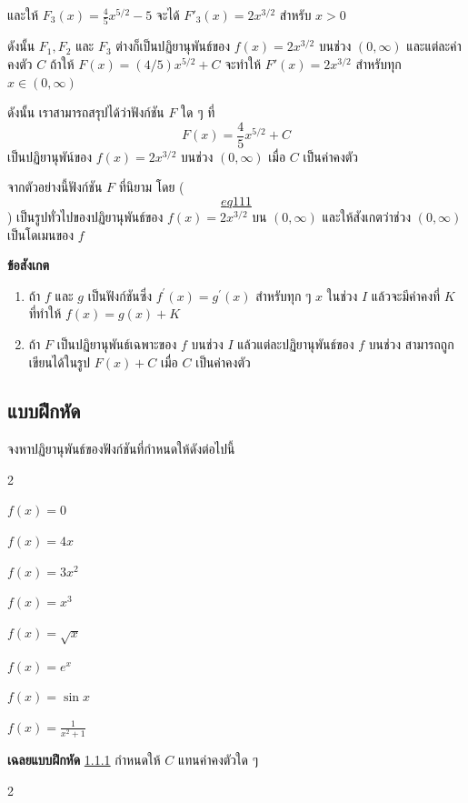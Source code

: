 \documentclass[
]{book}
\theoremstyle{definition}
\theoremstyle{definition}
\theoremstyle{definition}
\theoremstyle{definition}
\theoremstyle{remark}
\begin{document}
และให้ \(\displaystyle F_{3}(x) = \frac{4}{5} x^{5/2} - 5\) จะได้
\(F'_3(x) = 2x^{3/2}\) สำหรับ \(x > 0\)

ดังนั้น \(F_1,F_2\) และ \(F_3\) ต่างก็เป็นปฏิยานุพันธ์ของ \(f(x) = 2x^{3/2}\) บนช่วง
\(\left( {0 ,\infty } \right)\) และแต่ละค่าคงตัว \(C\) ถ้าให้
\(F(x) =(4/5)x^{5/2} + C\) จะทำให้ \(F'(x) = 2x^{3/2}\) สำหรับทุก
\(x \in \left( 0 ,\infty  \right)\)

ดังนั้น เราสามารถสรุปได้ว่าฟังก์ชัน \(F\) ใด ๆ ที่ \[\label{eq111} 
    F(x) = \frac{4}{5} x^{5/2} + C\] เป็นปฏิยานุพัน์ของ \(f(x) = 2x^{3/2}\)
บนช่วง \(\left( 0 ,\infty  \right)\) เมื่อ \(C\) เป็นค่าคงตัว

จากตัวอย่างนี้ฟังก์ชัน \(F\) ที่นิยาม โดย (\hyperref[eq111]{\[eq111\]}) เป็นรูปทั่วไปของปฏิยานุพันธ์ของ \(f(x) = 2x^{3/2}\) บน
\(\left( 0 ,\infty  \right)\) และให้สังเกตว่าช่วง \(\left( 0
,\infty  \right)\) เป็นโดเมนของ \(f\)

\textbf{ข้อสังเกต}

\begin{enumerate}
\def\labelenumi{\arabic{enumi}.}
\item
  ถ้า \(f\) และ \(g\) เป็นฟังก์ชันซึ่ง \(f^{'}(x) = g^{'}(x)\) สำหรับทุก ๆ \(x\) ในช่วง
  \(I\) แล้วจะมีค่าคงที่ \(K\) ที่ทำให้ \(f(x) = g(x) + K\)
\item
  ถ้า \(F\) เป็นปฏิยานุพันธ์เฉพาะของ \(f\) บนช่วง \(I\) แล้วแต่ละปฏิยานุพันธ์ของ \(f\)
  บนช่วง สามารถถูกเขียนได้ในรูป \(F(x) + C\) เมื่อ \(C\) เป็นค่าคงตัว
\end{enumerate}

\subsection{แบบฝึกหัด}\label{prob-anti}

จงหาปฏิยานุพันธ์ของฟังก์ชันที่กำหนดให้ดังต่อไปนี้

2

\(f(x) = 0\)

\(f(x) = 4x\)

\(f(x) = 3x^{2 }\)

\(f(x) = x^{3}\)

\(f(x) = \sqrt{x}\)

\(f(x) = e^{x}\)

\(f(x) = \sin x\)

\(f(x) = \frac{1}{x^{2}+1}\)

\textbf{เฉลยแบบฝึกหัด} \hyperref[prob-anti]{1.1.1} กำหนดให้ \(C\) แทนค่าคงตัวใด ๆ

2
\end{document}
